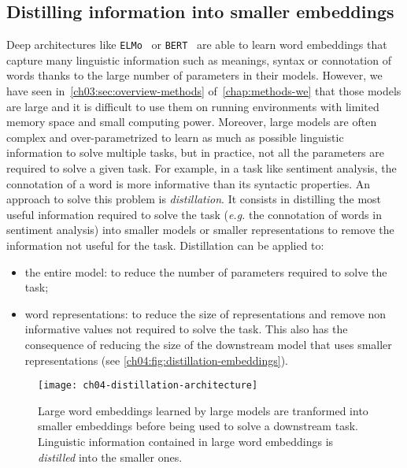   \subsection{Distilling information into smaller embeddings}
    \label{ch04:subsec:distillation}
    Deep architectures like \texttt{ELMo}~\citep{peters2018elmo} or
    \texttt{BERT}~\citep{devlin2019bert} are able to learn word embeddings that
    capture many linguistic information such as meanings, syntax or connotation
    of words thanks to the large number of parameters in their models. However,
    we have seen in~\autoref{ch03:sec:overview-methods}
    of~\autoref{chap:methods-we} that those models are large and it is difficult
    to use them on running environments with limited memory space and small
    computing power. Moreover, large models are often complex and
    over-parametrized to learn as much as possible linguistic information to
    solve multiple tasks, but in practice, not all the parameters are required
    to solve a given task. For example, in a task like sentiment analysis, the
    connotation of a word is more informative than its syntactic properties.  An
    approach to solve this problem is \textit{distillation}. It consists in
    distilling the most useful information required to solve the task
    (\textit{e.g.} the connotation of words in sentiment analysis) into smaller
    models or smaller representations to remove the information not useful for
    the task. Distillation can be applied to:

    \begin{itemize}
      \item the entire model: to reduce the number of parameters required to
        solve the task;
      \item word representations: to reduce the size of representations and
        remove non informative values not required to solve the task. This also
        has the consequence of reducing the size of the downstream model that
        uses smaller representations (see
        \autoref{ch04:fig:distillation-embeddings}).
    \end{itemize}

    \begin{figure}[h]
      \centering
      \texttt{[image: ch04-distillation-architecture]}
      \caption[Distillation of word embeddings.] {Large word embeddings learned
      by large models are tranformed into smaller embeddings before being used
      to solve a downstream task. Linguistic information contained in large word
      embeddings is \textit{distilled} into the smaller ones.}
      \label{ch04:fig:distillation-embeddings}
    \end{figure}

